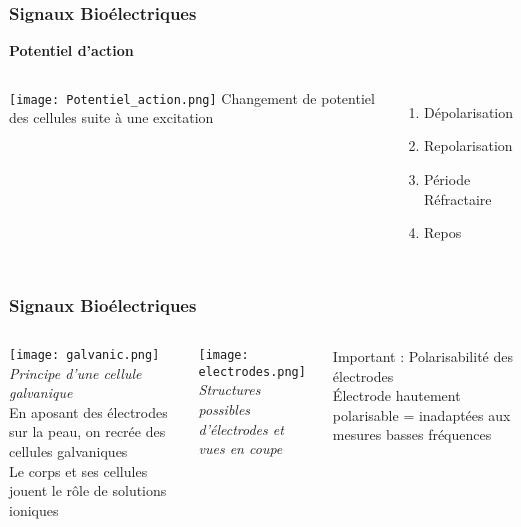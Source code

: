 \documentclass{beamer}
\begin{document}
\begin{frame}
\frametitle{Signaux Bioélectriques}
\textbf{Potentiel d'action}
\begin{columns}
\column{60mm}
\texttt{[image: Potentiel\_action.png]}
\column{60mm}
Changement de potentiel des cellules suite à une excitation
\begin{enumerate}
\item Dépolarisation
\item Repolarisation
\item Période Réfractaire
\item Repos
\end{enumerate}
\end{columns}
\end{frame}

\begin{frame}
\frametitle{Signaux Bioélectriques}
\begin{columns}
\column{60mm}
\texttt{[image: galvanic.png]}\\
\textit{\footnotesize{Principe d'une cellule galvanique}}\\
\vspace{0.3cm}
\small{En aposant des électrodes sur la peau, on recrée des cellules galvaniques\\
\vspace{0.3cm}
Le corps et ses cellules jouent le rôle de solutions ioniques
}


\column{60mm}
\texttt{[image: electrodes.png]}\\
\textit{\footnotesize{Structures possibles d'électrodes et vues en coupe}}\\
\vspace{0.3cm}
\small{Important : Polarisabilité des électrodes\\

\vspace{0.3cm}
\'Electrode hautement polarisable = inadaptées aux mesures basses fréquences

}

\end{columns}
\end{frame}
\end{document}
